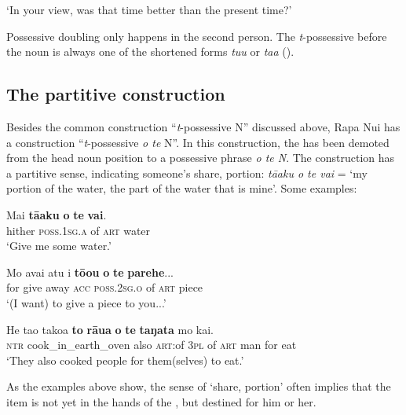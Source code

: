 \glt
‘In your view, was that time better than the present time?’ \textstyleExampleref{[R380.106]} 
\z

Possessive doubling only happens in the second person. The \textit{t}{}-possessive before the noun is always one of the shortened forms \textit{tu{\ꞌ}u} or \textit{ta{\ꞌ}a} ().

\subsection{The partitive construction}\label{sec:6.2.2}
Besides the common construction “\textit{t}{}-possessive N” discussed above, Rapa Nui has a construction “\textit{t}{}-possessive \textit{o te} N”. In this construction, the  has been demoted from the head noun position to a possessive phrase \textit{o te N}. The construction has a partitive sense, indicating someone’s share, portion: \textit{\mbox{tā{\ꞌ}aku} o te vai} = ‘my portion of the water, the part of the water that is mine’. Some examples: 

\ea\label{ex:6.16}
\gll Mai \textbf{tā{\ꞌ}aku} \textbf{o} \textbf{te} \textbf{vai}. \\
hither \textsc{poss.1sg.a} of \textsc{art} water \\

\glt 
‘Give me some water.’ \textstyleExampleref{[Notes]}
\z

\ea\label{ex:6.17}
\gll Mo {\ꞌ}avai atu i \textbf{tō{\ꞌ}ou} \textbf{o} \textbf{te} \textbf{parehe}... \\
for give away \textsc{acc} \textsc{poss.2sg.o} of \textsc{art} piece \\

\glt 
‘(I want) to give a piece to you...’ \textstyleExampleref{[R219.021]} 
\z

\ea\label{ex:6.18}
\gll He ta{\ꞌ}o tako{\ꞌ}a \textbf{to} \textbf{rāua} \textbf{o} \textbf{te} \textbf{taŋata} mo kai.\\
\textsc{ntr} cook\_in\_earth\_oven also \textsc{art}:of \textsc{3pl} of \textsc{art} man for eat\\

\glt
‘They also cooked people for them(selves) to eat.’ \textstyleExampleref{[Mtx-3-01.282]}
\z

As the examples above show, the sense of ‘share, portion’ often implies that the item is not yet in the hands of the , but destined for him or her. 


